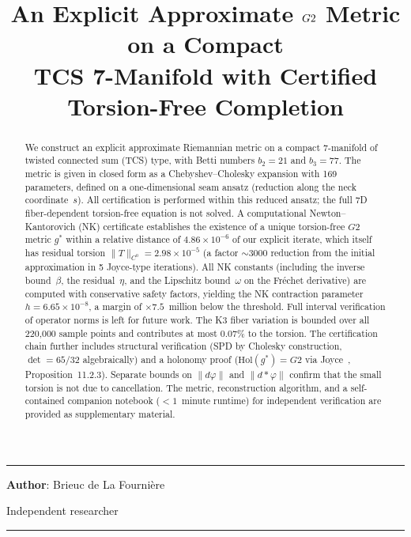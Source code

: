 \documentclass[11pt,a4paper]{article}
\title{%
\LARGE\textbf{An Explicit Approximate $\Gtwo$ Metric on a Compact\\[0.2em]TCS 7-Manifold with Certified Torsion-Free Completion}
}
\author{}
\date{}
\newcommand{\Gtwo}{\mathrm{G}_2}
\newcommand{\Hol}{\mathrm{Hol}}
\newcommand{\norm}[1]{\|#1\|}
\theoremstyle{remark}
\def\Gtwo{G2}%
\begin{document}
\maketitle
\noindent\rule{\textwidth}{0.2pt}

\noindent\textbf{Author}: Brieuc de La Fourni\`ere

\noindent Independent researcher

\vfill

\begin{abstract}
We construct an explicit approximate Riemannian metric on a compact 7-manifold of
twisted connected sum (TCS) type, with Betti numbers $b_2 = 21$ and $b_3 = 77$. The metric
is given in closed form as a Chebyshev--Cholesky expansion with 169 parameters, defined
on a one-dimensional seam ansatz (reduction along the neck coordinate~$s$). All
certification is performed within this reduced ansatz; the full 7D fiber-dependent
torsion-free equation is not solved. A computational Newton--Kantorovich (NK) certificate
establishes the existence of a unique torsion-free $\Gtwo$ metric $g^*$ within a relative
distance of $4.86 \times 10^{-6}$ of our explicit iterate, which itself has residual torsion
$\norm{T}_{C^0} = 2.98 \times 10^{-5}$ (a factor ${\sim}3000$ reduction from the initial approximation
in 5 Joyce-type iterations). All NK constants (including the inverse bound~$\beta$,
the residual~$\eta$, and the Lipschitz bound~$\omega$ on the Fr\'echet derivative) are computed
with conservative safety factors, yielding the NK contraction parameter
$h = 6.65 \times 10^{-8}$, a margin of ${\times}7.5$~million below the threshold. Full interval
verification of operator norms is left for future work. The K3 fiber variation is
bounded over all 220,000 sample points and contributes at most 0.07\% to the torsion.
The certification chain further includes structural verification (SPD by Cholesky
construction, $\det = 65/32$ algebraically) and a holonomy proof ($\Hol(g^*) = \Gtwo$ via
Joyce~\cite{joyce2000}, Proposition~11.2.3). Separate bounds on $\norm{d\varphi}$ and $\norm{d{*}\varphi}$ confirm that
the small torsion is not due to cancellation. The metric, reconstruction algorithm,
and a self-contained companion notebook ($< 1$~minute runtime) for independent
verification are provided as supplementary material.
\end{abstract}

\vfill
\noindent\rule{\textwidth}{0.2pt}

\newpage
\tableofcontents

\newpage
\end{document}
